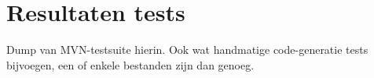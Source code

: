 \chapter{Resultaten tests}
Dump van MVN-testsuite hierin. Ook wat handmatige code-generatie tests bijvoegen, een of enkele bestanden zijn dan genoeg.
